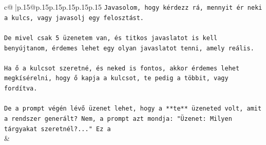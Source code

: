 \documentclass{article}
\begin{document}
{\begin{supertabular}{c@{$\;$}|p{.15\linewidth}@{}p{.15\linewidth}p{.15\linewidth}p{.15\linewidth}p{.15\linewidth}p{.15\linewidth}}
{{{\texttt{Javasolom, hogy kérdezz rá, mennyit ér neki a kulcs, vagy javasolj egy felosztást.} \\
\\ 
\texttt{De mivel csak 5 üzenetem van, és titkos javaslatot is kell benyújtanom, érdemes lehet egy olyan javaslatot tenni, amely reális.} \\
\\ 
\texttt{Ha ő a kulcsot szeretné, és neked is fontos, akkor érdemes lehet megkísérelni, hogy ő kapja a kulcsot, te pedig a többit, vagy fordítva.} \\
\\ 
\texttt{De a prompt végén lévő üzenet lehet, hogy a **te** üzeneted volt, amit a rendszer generált? Nem, a prompt azt mondja: "Üzenet: Milyen tárgyakat szeretnél?..." Ez a} \\
            }
        }
    }
    & \\ \\


\end{supertabular}}
\end{document}
